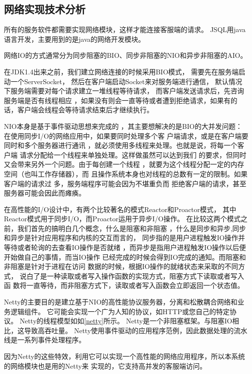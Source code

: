 \subsection{网络实现技术分析}
所有的服务软件都需要实现网络模块，这样才能连接客服端的请求。
JSQL用java语言开发，主要用到的是java的网络开发模块。

网络IO的方式通常分为同步阻塞的BIO、同步非阻塞的NIO和异步非阻塞的AIO。

在JDK1.4出来之前，我们建立网络连接的时候采用BIO模式，
需要先在服务端启动一个ServerSocket，
然后在客户端启动Socket来对服务端进行通信，
默认情况下服务端需要对每个请求建立一堆线程等待请求，
而客户端发送请求后，先咨询服务端是否有线程相应
，如果没有则会一直等待或者遭到拒绝请求，如果有的话，客户端会线程会等待请求结束后才继续执行。

NIO本身是基于事件驱动思想来完成的
，其主要想解决的是BIO的大并发问题：
 在使用同步I/O的网络应用中，如果要同时处理多个客
 户端请求，或是在客户端要同时和多个服务器进行通讯
 ，就必须使用多线程来处理。也就是说，将每一个客户端
 请求分配给一个线程来单独处理。这样做虽然可以达到我们
 的要求，但同时又会带来另外一个问题。由于每创建一个线程
 ，就要为这个线程分配一定的内存空间（也叫工作存储器），而
 且操作系统本身也对线程的总数有一定的限制。如果客户端的请求过
 多，服务端程序可能会因为不堪重负而
 拒绝客户端的请求，甚至服务器可能会因此而瘫痪。

在高性能的I/O设计中，有两个比较著名的模式Reactor和Proactor模式，
其中Reactor模式用于同步I/O，而Proactor运用于异步I/O操作。
在比较这两个模式之前，我们首先的搞明白几个概念，什么是阻塞和非阻塞
，什么是同步和异步,同步和异步是针对应用程序和内核的交互而言的，
同步指的是用户进程触发IO操作并等待或者轮询的去查看IO操作是否就绪
，而异步是指用户进程触发IO操作以后便开始做自己的事情，而当IO操作
已经完成的时候会得到IO完成的通知。而阻塞和非阻塞是针对于进程在访问
数据的时候，根据IO操作的就绪状态来采取的不同方式，
说白了是一种读取或者写入操作函数的实现方式，阻塞方式下读取或者写入函
数将一直等待，而非阻塞方式下，读取或者写入函数会立即返回一个状态值。

Netty的主要目的是建立基于NIO的高性能协议服务器，分离和松散耦合网络和业务逻辑组件。
它可能会实现一个广为人知的协议，如HTTP或您自己的特定协议。
Netty的线程模型如如\ref{netty}所示。
Netty是一个非阻塞框架。与阻塞IO相比，这导致高吞吐量。
Netty使用事件驱动的应用程序范例，因此数据处理的流水线是一系列事件处理程序。

因为Netty的这些特效，利用它可以实现一个高性能的网络应用程序，所以本系统的网络模块也是用的Netty来
实现的，它支持高并发的客服端访问。
